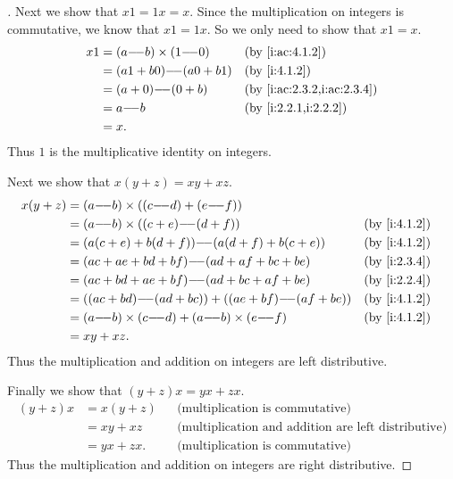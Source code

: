\begin{proof}[]
  Next we show that \(x1 = 1x = x\).
  Since the multiplication on integers is commutative, we know that \(x1 = 1x\).
  So we only need to show that \(x1 = x\).
  \begin{align*}
    x1 & = (a \mm b) \times (1 \mm 0) &  & \by{i:ac:4.1.2}            \\
       & = (a1 + b0) \mm (a0 + b1)    &  & \by{i:4.1.2}               \\
       & = (a + 0) \mm (0 + b)        &  & \by{i:ac:2.3.2,i:ac:2.3.4} \\
       & = a \mm b                    &  & \by{i:2.2.1,i:2.2.2}       \\
       & = x.
  \end{align*}
  Thus \(1\) is the multiplicative identity on integers.

  Next we show that \(x(y + z) = xy + xz\).
  \begin{align*}
    x(y + z) & = (a \mm b) \times ((c \mm d) + (e \mm f))                                  \\
             & = (a \mm b) \times ((c + e) \mm (d + f))                  &  & \by{i:4.1.2} \\
             & = (a(c + e) + b(d + f)) \mm (a(d + f) + b(c + e))         &  & \by{i:4.1.2} \\
             & = (ac + ae + bd + bf) \mm (ad + af + bc + be)             &  & \by{i:2.3.4} \\
             & = (ac + bd + ae + bf) \mm (ad + bc + af + be)             &  & \by{i:2.2.4} \\
             & = ((ac + bd) \mm (ad + bc)) + ((ae + bf) \mm (af + be))   &  & \by{i:4.1.2} \\
             & = (a \mm b) \times (c \mm d) + (a \mm b) \times (e \mm f) &  & \by{i:4.1.2} \\
             & = xy + xz.
  \end{align*}
  Thus the multiplication and addition on integers are left distributive.

  Finally we show that \((y + z)x = yx + zx\).
  \begin{align*}
    (y + z)x & = x(y + z) &  & \text{(multiplication is commutative)}                     \\
             & = xy + xz  &  & \text{(multiplication and addition are left distributive)} \\
             & = yx + zx. &  & \text{(multiplication is commutative)}
  \end{align*}
  Thus the multiplication and addition on integers are right distributive.
\end{proof}

